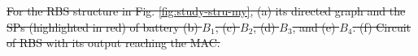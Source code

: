 \documentclass{article}
\providecommand{\DIFdel}[1]{{\protect\color{red}\sout{#1}}}                      %
\providecommand{\DIFdelFL}[1]{\DIFdel{#1}} %
\begin{document}
{%
}
\DIFdelFL{\hspace{0.05\textwidth}
    }%
{%
}
\DIFdelFL{\hspace{0.05\textwidth}
    }%
{%
}
{%
}
\DIFdelFL{\hspace{0.05\textwidth}
    }%
{%
}
\DIFdelFL{\hspace{0.05\textwidth}
    }%
{%
}
{%
\DIFdelFL{For the RBS structure in Fig. \ref{fig:study-stru-my}, 
        (a) its directed graph 
        and the SPs (highlighted in red) of battery (b) $B_1$, (c) $B_2$, (d) $B_3$, and (e) $B_4$.
        (f) Circuit of RBS with its output reaching the MAC.
        }}
\end{document}
